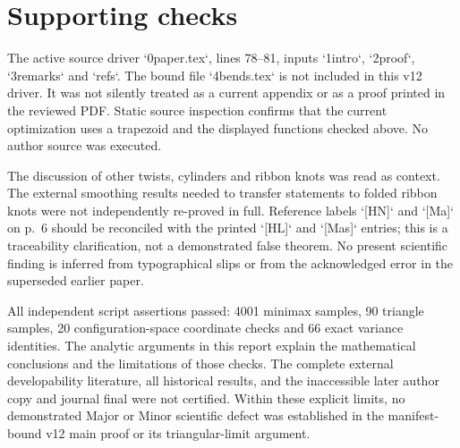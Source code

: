 \documentclass[10pt]{article}
\begin{document}
\section*{Supporting checks}
The active source driver `0paper.tex`, lines 78–81, inputs `1intro`, `2proof`, `3remarks` and `refs`. The bound file `4bends.tex` is not included in this v12 driver. It was not silently treated as a current appendix or as a proof printed in the reviewed PDF. Static source inspection confirms that the current optimization uses a trapezoid and the displayed functions checked above. No author source was executed.\par
The discussion of other twists, cylinders and ribbon knots was read as context. The external smoothing results needed to transfer statements to folded ribbon knots were not independently re-proved in full. Reference labels `[HN]` and `[Ma]` on p. 6 should be reconciled with the printed `[HL]` and `[Mas]` entries; this is a traceability clarification, not a demonstrated false theorem. No present scientific finding is inferred from typographical slips or from the acknowledged error in the superseded earlier paper.\par
All independent script assertions passed: 4001 minimax samples, 90 triangle samples, 20 configuration-space coordinate checks and 66 exact variance identities. The analytic arguments in this report explain the mathematical conclusions and the limitations of those checks. The complete external developability literature, all historical results, and the inaccessible later author copy and journal final were not certified. Within these explicit limits, no demonstrated Major or Minor scientific defect was established in the manifest-bound v12 main proof or its triangular-limit argument.\par
\end{document}

